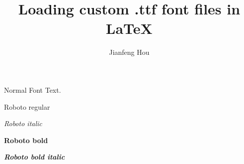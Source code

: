 \documentclass{article}
\title{Loading custom .ttf font files in \LaTeX}
\author{Jianfeng Hou}
\date{}
\begin{document}
\maketitle

Normal Font Text.

{\roboto Roboto regular}

{\roboto \textit{Roboto italic}}

{\roboto \textbf{Roboto bold}}

{\roboto \textit{\textbf{Roboto bold italic}}}
\end{document}
